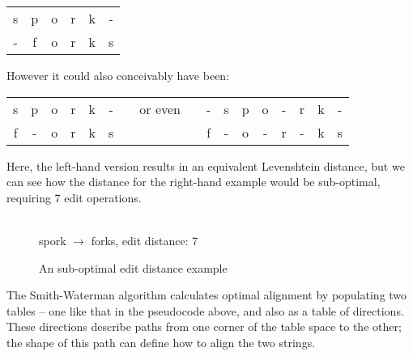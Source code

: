 \begin{center}
  \begin{tabular}{cccccc}
    s & p & o & r & k & -\\
    - & f & o & r & k & s 
  \end{tabular}
\end{center}

However it could also conceivably have been:

\begin{center}
  \begin{tabular}{ccccccccccccccccc}
    s & p & o & r & k & - & & or even & & - & s & p & o & - & r & k & -\\
    f & - & o & r & k & s & &         & & f & - & o & - & r & - & k & s    
  \end{tabular}
\end{center}\label{fig:sub-opt}

Here, the left-hand version results in an equivalent Levenshtein
distance, but we can see how the distance for the right-hand example
would be sub-optimal, requiring 7 edit operations.

\begin{figure}[h]
  \centering   
  \\
  \vspace{3 mm}
  spork $\rightarrow$ forks, edit distance: 7
  \caption{An sub-optimal edit distance example}
  \label{fig:fork-spork-subopt}
\end{figure}

The Smith-Waterman algorithm calculates optimal alignment by
populating two tables -- one like that in the pseudocode above, and
also as a table of directions.\cite{smithwaterman} These directions describe paths from
one corner of the table space to the other; the shape of this path
can define how to align the two strings.\cite{Smith1981}

